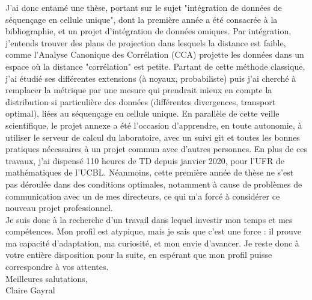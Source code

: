 \documentclass[a4paper,12pt]{article}
\begin{document}
J'ai donc entamé une thèse, portant sur le sujet "intégration de données de séquençage en cellule unique", dont la première année a été consacrée à la bibliographie, et un projet d'intégration de données omiques. 
%
Par intégration, j'entends trouver des plans de projection dans lesquels la distance est faible, comme l'Analyse Canonique des Corrélation (CCA) projette les données dans un espace où la distance "corrélation" est petite. Partant de cette méthode classique, j'ai étudié ses différentes extensions (à noyaux, probabiliste) puis j'ai cherché à remplacer la métrique par une mesure qui prendrait mieux en compte la distribution si particulière des données (différentes divergences, transport optimal), liées au séquençage en cellule unique. 
En parallèle de cette veille scientifique, le projet annexe a été l'occasion d'apprendre, en toute autonomie, à utiliser le serveur de calcul du laboratoire, avec un suivi git et toutes les bonnes pratiques nécessaires à un projet commun avec d'autres personnes.
En plus de ces travaux, j'ai dispensé 110 heures de TD depuis janvier 2020, pour l'UFR de mathématiques de l'UCBL. 
Néanmoins, cette première année de thèse ne s'est pas déroulée dans des conditions optimales, notamment à cause de problèmes de communication avec un de mes directeurs, ce qui m'a forcé à considérer ce nouveau projet professionnel.\\ 

Je suis donc à la recherche d'un travail dans lequel investir mon temps et mes compétences. Mon profil est atypique, mais je sais que c'est une force : il prouve ma capacité d'adaptation, ma curiosité, et mon envie d'avancer. 
%
Je reste donc à votre entière disposition pour la suite, en espérant que mon profil puisse correspondre à vos attentes. \\

Meilleures salutations, \\

Claire Gayral
\end{document}
